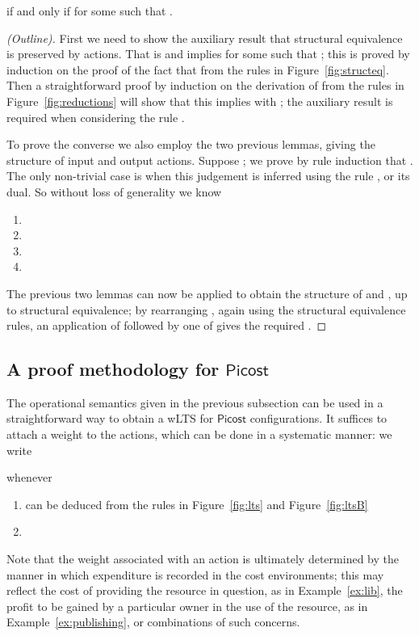 \documentclass{LMCS}
\newcommand{\pfn}[1]{\mathsf{#1}}  \newcommand{\cfn}[1]{\mathsf{#1}}  \newcommand{\ownfnt}[1]{{\mathsf{#1}}}
\newcommand{\picost}{\ensuremath{\pfn{Picost}}\xspace}
\begin{document}
\begin{thm}\label{prop:red.tau}
 if and only if
         for some 
    such that .
 \begin{proof}[(Outline)]

   First we need to show  the auxiliary result that structural
   equivalence is preserved by actions. That is  and  implies  for some  such that ; this
   is proved by induction on the proof of the fact that  from the rules in Figure~\ref{fig:structeq}. Then a
   straightforward proof by induction on the derivation of  from the rules in
   Figure~\ref{fig:reductions} will show that this implies  with ; the
   auxiliary result is required when considering the rule
   .

   To prove the converse we also employ the two previous lemmas, giving
   the structure of input and output actions. Suppose ; we prove by rule induction that
   . The only non-trivial case is
   when this judgement is inferred using the rule , or its dual. So 
without loss of generality we know 
   \begin{enumerate}[]
   \item 
   \item 
   \item 
   \item 
   \end{enumerate}
The previous two lemmas can now be applied to obtain the structure of  and
, up to structural equivalence; by rearranging , again using the structural
equivalence rules, an application of  followed by one of  gives the
required 
 .
  \end{proof}
\end{thm}

\subsection{A proof methodology for  \picost}\label{sec:examples}

The operational semantics  given in the previous subsection 
can be used in a straightforward way to obtain a wLTS for \picost 
configurations. It suffices to attach a weight to the actions, which
can be done in a systematic manner: we write 

whenever 
\begin{enumerate}[]
\item  can be deduced
from the rules in Figure~\ref{fig:lts} and Figure~\ref{fig:ltsB}

\item 
\end{enumerate}
Note that the weight associated with an action is ultimately determined by the manner
in which expenditure is recorded in the cost environments; this may reflect the cost of
providing the resource in question, as in Example~\ref{ex:lib}, the profit to be gained
by a particular owner in the use of the resource, as in Example~\ref{ex:publishing}, or 
combinations of such concerns.  
\end{document}
